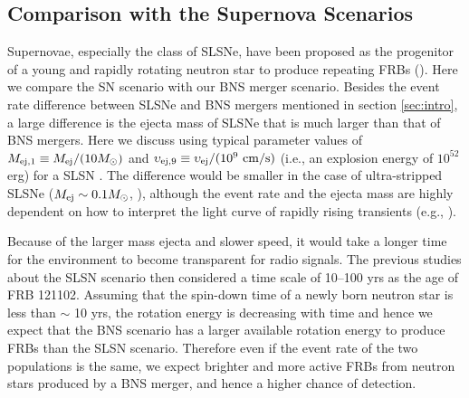 \documentclass[]{pasj01}
\begin{document}
\subsection{Comparison with the Supernova Scenarios}

Supernovae, especially the class of SLSNe, have been proposed as the
progenitor of a young and rapidly rotating neutron star to produce
repeating FRBs
(\cite{Kashiyama&Murase2017,Metzger2017,Beloborodov2017,Dai2017}). Here
we compare the SN scenario with our BNS merger scenario.  Besides the
event rate difference between SLSNe and BNS mergers mentioned in
section \ref{sec:intro}, a large difference is the ejecta mass of
SLSNe that is much larger than that of BNS mergers. Here we discuss
using typical parameter values of $M_{\rm ej, 1} \equiv M_{\rm ej} /
(10 M_\odot)$ and $\upsilon_{\rm ej, 9} \equiv \upsilon_{\rm ej} /
(10^9 \ \rm cm/s)$ (i.e., an explosion energy of $10^{52}$ erg) for a
SLSN \citep{Metzger2017}.  The difference would be smaller in the case
of ultra-stripped SLSNe ($M_{\rm ej} \sim 0.1 M_\odot$,
\cite{Kashiyama&Murase2017}), 
although the event rate and the ejecta mass are
  highly dependent on how to interpret the light curve of rapidly rising
  transients (e.g., \cite{Drout2014,Arcavi2016}).

Because of the larger mass ejecta and slower speed, it would take a
longer time for the environment to become transparent for radio
signals.  The previous studies about the SLSN scenario then considered a
time scale of 10--100 yrs as the age of FRB 121102. Assuming that the
spin-down time of a newly born neutron star is less than $\sim$ 10
yrs, the rotation energy is decreasing with time and hence we expect
that the BNS scenario has a larger available rotation energy to
produce FRBs than the SLSN scenario. Therefore even if the event rate
of the two populations is the same, we expect brighter and more
active FRBs from neutron stars produced by a BNS merger, and hence a
higher chance of detection.
\end{document}
